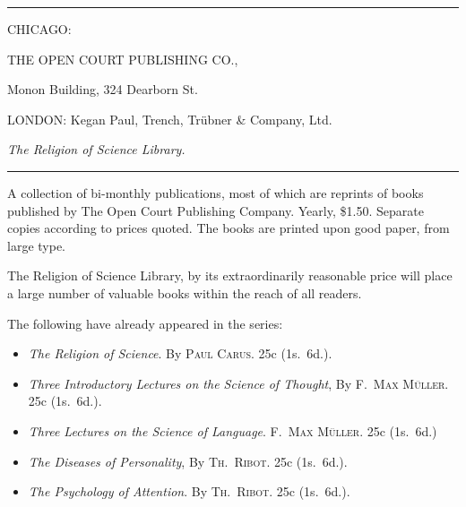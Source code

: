 \documentclass[oneside]{book}
\begin{document}
\begin{center}
\rule[.5ex]{3cm}{.2pt}

CHICAGO:
\medskip

{\Large THE OPEN COURT PUBLISHING CO.,}

Monon Building, 324 Dearborn St.

{\small LONDON: Kegan Paul, Trench, Trübner \& Company, Ltd.}
\end{center}


\newpage

\begin{center}
\textit{\Large The Religion of Science Library.}

\rule[.5ex]{3cm}{.2pt}
\end{center}

\begin{small}
A collection of bi-monthly publications, most of which are reprints of
books published by The Open Court Publishing Company. Yearly, \$1.50.
Separate copies according to prices quoted. The books are printed upon
good paper, from large type.

The Religion of Science Library, by its extraordinarily reasonable price
will place a large number of valuable books within the reach of all readers.

The following have already appeared in the series:
\begin{itemize}
\item[]\hspace{-3ex}
\textit{The Religion of Science}. By \textsc{Paul Carus}. 25c (1s.~6d.).

\item[]\hspace{-3ex}
\textit{Three Introductory Lectures on the Science of Thought}, By \textsc{F.~Max
Müller}.  25c (1s.~6d.).

\item[]\hspace{-3ex}
\textit{Three Lectures on the Science of Language}. \textsc{F.~Max Müller}. 25c (1s.~6d.)

\item[]\hspace{-3ex}
\textit{The Diseases of Personality}, By \textsc{Th.~Ribot}. 25c (1s.~6d.).

\item[]\hspace{-3ex}
\textit{The Psychology of Attention}. By \textsc{Th.~Ribot}. 25c (1s.~6d.).


\end{itemize}
\end{small}
\end{document}
